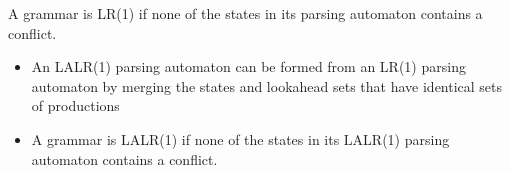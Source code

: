 A grammar is LR(1) if none of the states in its parsing automaton contains a conflict.


\begin{itemize}
    \item An LALR(1) parsing automaton can be formed from an LR(1) parsing automaton by 
    merging the states and lookahead sets that have identical sets of productions
    \item A grammar is LALR(1) if none of the states in its LALR(1) parsing automaton contains 
    a conflict.
\end{itemize}